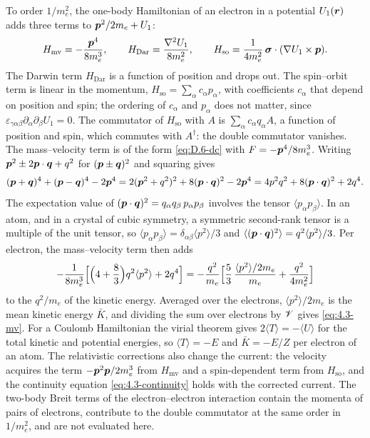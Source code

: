 To order $1/m_e^2$, the one-body Hamiltonian of an electron in a potential $U_1(\bm{r})$ adds three terms to $\bm{p}^2/2m_e + U_1$:
\begin{equation*}
  H_{\mathrm{mv}} = -\frac{\bm{p}^4}{8m_e^3}, \qquad H_{\mathrm{Dar}} = \frac{\nabla^2U_1}{8m_e^2}, \qquad H_{\mathrm{so}} = \frac{1}{4m_e^2}\,\bm{\sigma}\cdot(\nabla U_1\times\bm{p}) .
\end{equation*}
The Darwin term $H_{\mathrm{Dar}}$ is a function of position and drops out. The spin--orbit term is linear in the momentum, $H_{\mathrm{so}} = \sum_\alpha c_\alpha p_\alpha$, with coefficients $c_\alpha$ that depend on position and spin; the ordering of $c_\alpha$ and $p_\alpha$ does not matter, since $\varepsilon_{\gamma\alpha\beta}\partial_\alpha\partial_\beta U_1 = 0$. The commutator of $H_{\mathrm{so}}$ with $A$ is $\sum_\alpha c_\alpha q_\alpha A$, a function of position and spin, which commutes with $A^\dagger$: the double commutator vanishes. The mass--velocity term is of the form \cref{eq:D.6-dc} with $F = -\bm{p}^4/8m_e^3$. Writing $\bm{p}^2 \pm 2\bm{p}\cdot\bm{q} + q^2$ for $(\bm{p} \pm \bm{q})^2$ and squaring gives
\begin{equation*}
  (\bm{p} + \bm{q})^4 + (\bm{p} - \bm{q})^4 - 2\bm{p}^4 = 2(\bm{p}^2 + q^2)^2 + 8(\bm{p}\cdot\bm{q})^2 - 2\bm{p}^4 = 4p^2q^2 + 8(\bm{p}\cdot\bm{q})^2 + 2q^4 .
\end{equation*}
The expectation value of $(\bm{p}\cdot\bm{q})^2 = q_\alpha q_\beta\,p_\alpha p_\beta$ involves the tensor $\langle p_\alpha p_\beta\rangle$. In an atom, and in a crystal of cubic symmetry, a symmetric second-rank tensor is a multiple of the unit tensor, so $\langle p_\alpha p_\beta\rangle = \delta_{\alpha\beta}\langle p^2\rangle/3$ and $\langle(\bm{p}\cdot\bm{q})^2\rangle = q^2\langle p^2\rangle/3$. Per electron, the mass--velocity term then adds
\begin{equation*}
  -\frac{1}{8m_e^3}\Bigl[\Bigl(4 + \frac83\Bigr)q^2\langle p^2\rangle + 2q^4\Bigr] = -\frac{q^2}{m_e}\Bigl[\frac53\,\frac{\langle p^2\rangle/2m_e}{m_e} + \frac{q^2}{4m_e^2}\Bigr]
\end{equation*}
to the $q^2/m_e$ of the kinetic energy. Averaged over the electrons, $\langle p^2\rangle/2m_e$ is the mean kinetic energy $\bar K$, and dividing the sum over electrons by $\mathscr{V}$ gives \cref{eq:4.3-mv}. For a Coulomb Hamiltonian the virial theorem gives $2\langle T\rangle = -\langle U\rangle$ for the total kinetic and potential energies, so $\langle T\rangle = -E$ and $\bar K = -E/Z$ per electron of an atom. The relativistic corrections also change the current: the velocity acquires the term $-\bm{p}^2\bm{p}/2m_e^3$ from $H_{\mathrm{mv}}$ and a spin-dependent term from $H_{\mathrm{so}}$, and the continuity equation \cref{eq:4.3-continuity} holds with the corrected current. The two-body Breit terms of the electron--electron interaction contain the momenta of pairs of electrons, contribute to the double commutator at the same order in $1/m_e^2$, and are not evaluated here.
